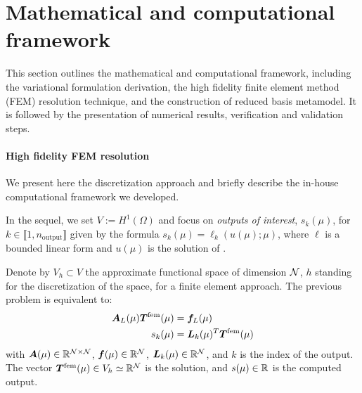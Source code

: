 \section{Mathematical and computational framework}
\label{sec:model-num}


This section outlines the mathematical and computational framework, including the variational formulation derivation, the high fidelity finite element method (FEM) resolution technique, and the construction of reduced basis metamodel.
It is followed by the presentation of numerical results, verification and validation steps.






\paragraph*{High fidelity FEM resolution}

We present here the discretization approach and briefly describe the in-house computational framework we developed.

In the sequel, we set $V:= H^1(\Omega)$ and focus on \emph{outputs of interest}, $s_k(\mu)$, for $k\in\llbracket 1, n_\text{output}\rrbracket$ given by the formula $s_k(\mu) = \ell_k(u(\mu); \mu)$,
where $\ell$ is a bounded linear form and $u(\mu)$ is the solution of .

Denote by $V_h\subset V$ the approximate functional space of dimension $\mathcal{N}$, $h$ standing for the discretization of the space, for a finite element approach.
The previous problem is equivalent to:
\begin{subequations}
\begin{align}
    \mat{A}_L(\mu) \vct{T}^\fem(\mu) &= \vct{f}_L(\mu)\\
    s_k(\mu) &= \vct{L}_k(\mu)^T \vct{T}^\fem(\mu)
\end{align}
\label{eq:fe-syst}
\end{subequations}
with $\mat{A}(\mu)\in\R^{\N\times\N}$, $\vct{f}(\mu)\in\R^{\N}$, $\vct{L}_k(\mu)\in\R^{\N}$, and $k$ is the index of the output.
The vector $\vct{T}^\fem(\mu)\in V_h \simeq\R^{\N}$ is the solution, and $s(\mu)\in\mathbb{R}$ is the computed output.

